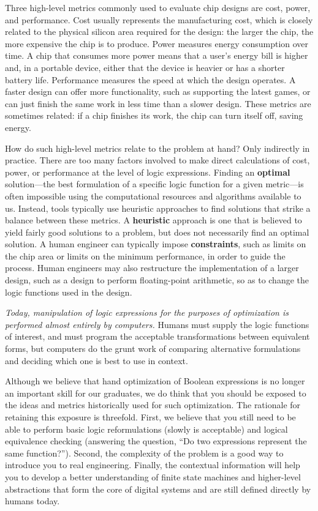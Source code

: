 Three high-level metrics commonly used to evaluate chip
designs are cost, power, and performance.  Cost usually represents the
manufacturing cost, which is closely related to the physical silicon
area required for the design: the larger the chip, the more expensive
the chip is to produce.  Power measures energy consumption over
time.  A chip that consumes more power means that a user's energy bill
is higher and, in a portable device, either that the device is heavier or has
a shorter battery life.  Performance measures the speed at which the
design operates.  A faster design can offer more functionality, such as
supporting the latest games, or can just finish the same work in less
time than a slower design.  These metrics are sometimes related: if
a chip finishes its work, the chip can turn itself off, saving energy.

How do such high-level metrics relate to the problem at hand?  Only
indirectly in practice.  There are too many factors involved to make
direct calculations of cost, power, or performance at the level of
logic expressions.  
%
Finding an {\bf optimal} solution---the best formulation of a specific
logic function for a given metric---is often impossible using the 
computational resources and algorithms available to us.
%
Instead, tools typically use heuristic approaches
to find solutions that strike a balance between these metrics.
A {\bf heuristic} approach is one that is
believed to yield fairly good solutions to a problem, but does
not necessarily find an optimal solution.
%
A human engineer can typically impose {\bf constraints}, such as
limits on the chip area or limits on the minimum performance,
in order to guide the process.
%
Human engineers may also restructure the implementation of a 
larger design, such as a design to perform floating-point arithmetic,
so as to change the logic functions used in the design.

{\em Today, manipulation of logic expressions for the purposes of 
optimization is performed almost entirely by computers.}  Humans must
supply the logic functions of interest, and must program the acceptable 
transformations between equivalent forms, but computers do the grunt
work of comparing alternative formulations and deciding which one is
best to use in context.

Although we believe that hand optimization of Boolean expressions is no
longer an important skill for our graduates, we do think that you
should be exposed to the ideas and metrics historically used for
such optimization.  The rationale for retaining this exposure is 
threefold. 
%
First, we believe that you still need to be able to perform basic
logic reformulations (slowly is acceptable)
and logical equivalence checking (answering the question, ``Do two 
expressions represent the same function?'').
%
Second, the complexity of the problem is a good way to introduce you
to real engineering.
%
Finally, the contextual information will help you to develop a better
understanding of finite state machines and higher-level abstractions
that form the core of digital systems and are still defined directly
by humans today.

